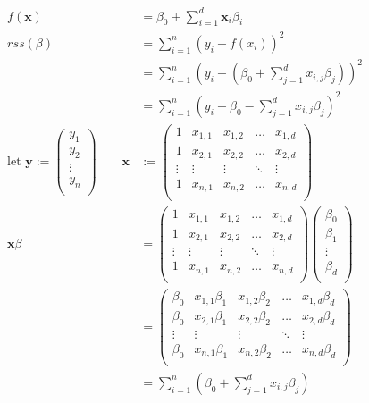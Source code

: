 \documentclass{article}
\begin{document}
\begin{align*}
f(\textbf{x}) &= \beta_0 + \sum_{i = 1} ^ d \textbf{x}_i \beta_i\\
rss(\beta) &= \sum_{i = 1} ^ n (y_i - f(x_i)) ^ 2\\
&= \sum_{i = 1} ^ n (y_i - (\beta_0 + \sum_{j = 1} ^ d x_{i, j} \beta_j)) ^ 2\\
&= \sum_{i = 1} ^ n (y_i - \beta_0 - \sum_{j = 1} ^ d x_{i, j} \beta_j) ^ 2\\
\text{let }\textbf{y} := 
\begin{pmatrix}
y_1\\
y_2\\
\vdots\\
y_n\\
\end{pmatrix}
\qquad
\textbf{x} &:=
\begin{pmatrix}
1 & x_{1, 1} & x_{1, 2} & \dots & x_{1, d}\\
1 & x_{2, 1} & x_{2, 2} & \dots & x_{2, d}\\
\vdots & \vdots & \vdots & \ddots & \vdots\\
1 & x_{n, 1} & x_{n, 2} & \dots & x_{n, d}\\
\end{pmatrix}\\
\textbf{x}\beta &= 
\begin{pmatrix}
1 & x_{1, 1} & x_{1, 2} & \dots & x_{1, d}\\
1 & x_{2, 1} & x_{2, 2} & \dots & x_{2, d}\\
\vdots & \vdots & \vdots & \ddots & \vdots\\
1 & x_{n, 1} & x_{n, 2} & \dots & x_{n, d}\\
\end{pmatrix}
\begin{pmatrix}
\beta_0\\
\beta_1\\
\vdots\\
\beta_d\\
\end{pmatrix}\\
&=
\begin{pmatrix}
\beta_0 & x_{1, 1}\beta_1 & x_{1, 2}\beta_2 & \dots & x_{1, d}\beta_d\\
\beta_0 & x_{2, 1}\beta_1 & x_{2, 2}\beta_2 & \dots & x_{2, d}\beta_d\\
\vdots & \vdots & \vdots & \ddots & \vdots\\
\beta_0 & x_{n, 1}\beta_1 & x_{n, 2}\beta_2 & \dots & x_{n, d}\beta_d\\
\end{pmatrix}\\
&= \sum_{i = 1} ^ n (\beta_0 + \sum_{j = 1} ^ d x_{i, j} \beta_j)
\end{align*}
\end{document}
